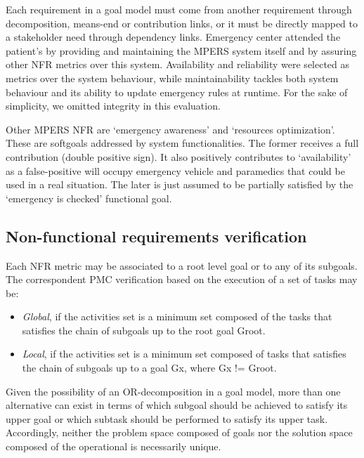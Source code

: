 Each requirement in a goal model must come from another requirement through decomposition, means-end or contribution links, or it must be directly mapped to a stakeholder need through dependency links. Emergency center attended the patient's by providing and maintaining the MPERS system itself and by assuring other NFR metrics over this system. Availability and reliability were selected as metrics over the system behaviour, while maintainability tackles both system behaviour and its ability to update emergency rules at runtime. For the sake of simplicity, we omitted integrity in this evaluation. 

Other MPERS NFR are `emergency awareness' and `resources optimization'. These are softgoals addressed by system functionalities. The former receives a full contribution (double positive sign). It also positively contributes to `availability' as a false-positive will occupy emergency vehicle and paramedics that could be used in a real situation. The later is just assumed to be partially satisfied by the `emergency is checked' functional goal.

\subsection{Non-functional requirements verification}

Each NFR metric may be associated to a root level goal or to any of its subgoals. The correspondent PMC verification based on the execution of a set of tasks may be:

\begin{itemize}

\item \textit{Global}, if the activities set is a minimum set composed of the tasks that satisfies the chain of subgoals up to the root goal Groot.
\medskip

\item \textit{Local}, if the activities set is a minimum set composed of tasks that satisfies the chain of subgoals up to a goal Gx, where Gx != Groot.
\medskip

\end{itemize}


Given the possibility of an OR-decomposition in a goal model, more than one alternative can exist in terms of which subgoal should be achieved to satisfy its upper goal or which subtask should be performed to satisfy its upper task. Accordingly, neither the problem space composed of goals nor the solution space composed of the operational is necessarily unique.


